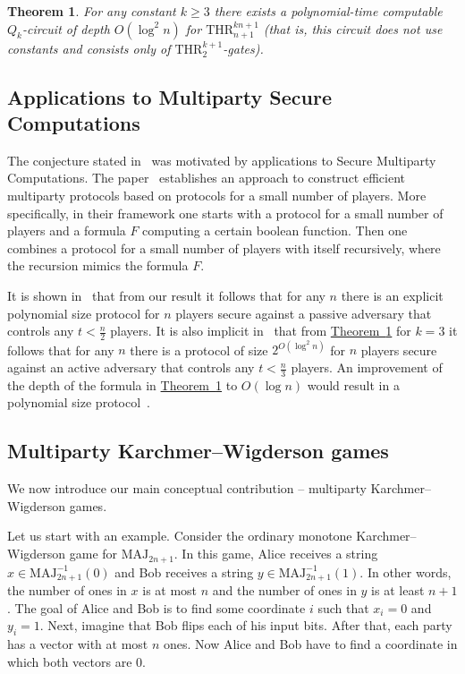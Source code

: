 \documentclass[11pt]{article}
\numberwithin{equation}{section}
\newtheorem{theorem}{Theorem}[section]
\theoremstyle{definition}
\theoremstyle{plain}
\newcommand{\expref}[2]{\hyperref[#2]{#1~\ref{#2}}}
\def\MAJ{\mathrm{MAJ}}
\def\THR{\mathrm{THR}}
\begin{document}
\begin{theorem}
\label{cohen_2}
For any constant $k\ge 3$ 
there exists a polynomial-time computable
%
%
%
$Q_k$-circuit 
of depth  $O(\log^2 n)$  %
for $\THR^{k n + 1}_{n + 1}$ (that is, this circuit does not use constants
and consists only of $\THR^{k+1}_2$-gates).
\end{theorem}


\subsection{Applications to Multiparty Secure Computations}

The conjecture stated in~\cite{Cohen2013} was motivated by applications to Secure Multiparty Computations. The paper~\cite{Cohen2013} establishes an approach to construct efficient multiparty protocols based on protocols for a small number of players. More specifically, in their framework one starts with a protocol for a small number of players and a formula $F$ computing a certain boolean function. Then one combines a protocol for a small number of players with itself recursively, where the recursion mimics the formula $F$.

It is shown in~\cite{Cohen2013} that from our result it follows that for any $n$ there is an explicit polynomial size protocol for $n$ players secure against a passive adversary that controls any $t < \frac n2$ players. It is also implicit in~\cite{Cohen2013} that from \expref{Theorem}{cohen_2} for $k=3$ it follows that for any $n$ there is a protocol of size $2^{O(\log^2 n)}$ for $n$ players secure against an active adversary that controls any $t < \frac n3$ players. An improvement of the depth of the formula in \expref{Theorem}{cohen_2} to $O(\log n)$ would result in a polynomial size protocol~\cite{Cohen2013}. 



\subsection{Multiparty Karchmer--Wigderson games}

We now introduce our main conceptual contribution -- multiparty Karchmer--Wigderson games.


 Let us start with an example. Consider the ordinary monotone Karchmer--Wigderson game for $\MAJ_{2n + 1}$. In this game, Alice receives a string $x\in \MAJ_{2n + 1}^{-1}(0)$ and Bob receives a string $y \in\MAJ_{2n + 1}^{-1}(1)$. In other words, the number of ones in $x$ is at most $n$ and the number of ones in $y$ is at least  $n + 1$. The goal of Alice and Bob is to find some coordinate $i$ such that $x_i = 0$ and $y_i = 1$. Next, imagine that Bob flips each of his input bits. After that, each party has a vector with at most $n$ ones. Now Alice and Bob have to find a coordinate in which both vectors are $0$.
\end{document}
